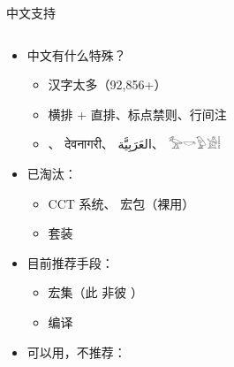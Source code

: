 \begin{frame}{中文支持}
\begin{columns}
\begin{column}{0.66\textwidth}
  \begin{itemize}
    \item 中文有什么特殊？\pause

      \begin{itemize}
        \item 汉字太多（92,856+）\pause
        \item 横排 + 直排、标点禁则、行间注  \pause
        \item {}、
              {\NotoDevanagari देवनागरी}、
              {\NotoArabic العَرَبِيَّة‎}、
              {\NotoEgyptian 𓅡𓎡𓅱𓀀𓏪}
      \end{itemize} \pause

    \item 已淘汰：

      \begin{itemize}
        \item CCT 系统、 宏包（裸用）
        \item \CTeX{} 套装
      \end{itemize} \pause

    \item 目前推荐手段：

      \begin{itemize}
        \item \alert{ 宏集}（此  非彼 \CTeX{}）
        \item \XeLaTeX{} 编译
      \end{itemize} \pause

    \item 可以用，不推荐：


\end{itemize}
\end{column}
\end{columns}
\end{frame}
